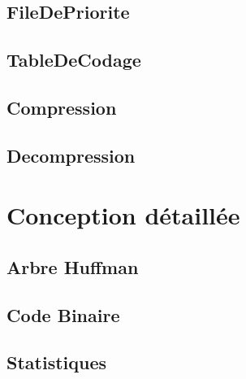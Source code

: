 \documentclass{article}
\begin{document}


\subsection{\textbf{FileDePriorite}}



\subsection{\textbf{TableDeCodage}}



\subsection{\textbf{Compression}}



\subsection{\textbf{Decompression}}



\newpage

\section{Conception détaillée}

\subsection{\textbf{Arbre Huffman}}



\subsection{\textbf{Code Binaire}}



\subsection{\textbf{Statistiques}}


\end{document}
